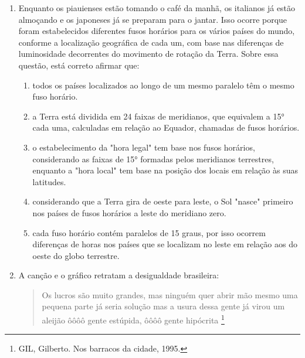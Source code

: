 \documentclass[10pt,a4paper]{article}
\begin{document}
\begin{multicols}{2}
\begin{enumerate}
	\item Enquanto os piauienses est\~ao tomando o caf\'e da manh\~a, os italianos j\'a est\~ao almo\c{c}ando e os japoneses j\'a se preparam para o jantar. Isso ocorre porque foram estabelecidos diferentes fusos hor\'arios para os v\'arios pa\'ises do mundo, conforme a localiza\c{c}\~ao geogr\'afica de cada um, com base nas diferen\c{c}as de luminosidade decorrentes do movimento de rota\c{c}\~ao da Terra. Sobre essa quest\~ao, est\'a correto afirmar que:
		\begin{enumerate}
		\item todos os pa\'ises localizados ao longo de um mesmo paralelo t\^em o mesmo fuso hor\'ario.
		\item a Terra est\'a dividida em 24 faixas de meridianos, que equivalem a 15° cada uma, calculadas em rela\c{c}\~ao ao Equador, chamadas de fusos hor\'arios. 
		\item o estabelecimento da "hora legal" tem base nos fusos hor\'arios, considerando as faixas de 15° formadas pelos meridianos terrestres, enquanto a "hora local" tem base na posi\c{c}\~ao dos locais em rela\c{c}\~ao \`as suas latitudes.
		\item considerando que a Terra gira de oeste para leste, o Sol "nasce" primeiro nos pa\'ises de fusos hor\'arios a leste do meridiano zero. 
		\item cada fuso hor\'ario cont\'em paralelos de 15 graus, por isso ocorrem diferen\c{c}as de horas nos pa\'ises que se localizam no leste em rela\c{c}\~ao aos do oeste do globo terrestre.
		\end{enumerate}

	\item  A can\c{c}\~ao e o gr\'afico retratam a desigualdade brasileira:
	\begin{quote}
		Os lucros s\~ao muito grandes, mas ningu\'em quer abrir m\~ao mesmo
		uma pequena parte j\'a seria solu\c{c}\~ao
		mas a usura dessa gente j\'a virou um aleij\~ao
		\^o\^o\^o\^o gente est\'upida, \^o\^o\^o\^o gente hip\'ocrita \footnote{GIL, Gilberto. Nos barracos da cidade, 1995.}
	\end{quote}


\end{enumerate}
\end{multicols}
\end{document}

